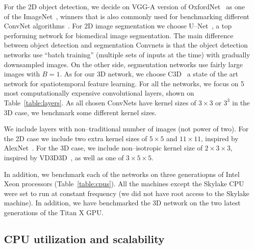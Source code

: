   For the 2D object detection, we decide on VGG-A version of
  OxfordNet~\cite{simonyan2014very} as one of the
  ImageNet~\cite{imagenet_cvpr09,ILSVRC15}, winners that is also
  commonly used for benchmarking different ConvNet
  algorithms~\cite{imagenetwinners}.  For 2D image segmentation we
  choose U--Net~\cite{ronneberger2015u}, a top performing network for
  biomedical image segmentation.  The main difference between object
  detection and segmentation Convnets is that the object detection
  networks use ``batch training'' (multiple sets of inputs at the
  time) with gradually downsampled images.  On the other side,
  segmentation networks use fairly large images with $B=1$.  As for
  our 3D network, we choose C3D~\cite{maturana_iros_2015} a state of
  the art network for spatiotemporal feature learning.  For all the
  networks, we focus on 5 most computationally expensive convolutional
  layers, shown on Table~\ref{table:layers}.  As all chosen ConvNets
  have kernel sizes of $3 \times 3$ or $3^3$ in the 3D case, we
  benchmark some different kernel sizes.

  We include layers with non--traditional number of images (not power
  of two).  For the 2D case we include two extra kernel sizes of $5
  \times 5$ and $11 \times 11$, inspired by
  AlexNet~\cite{krizhevsky2012imagenet}.  For the 3D case, we include
  non--isotropic kernel size of $2 \times 3 \times 3$, inspired by
  VD3D3D~\cite{lee2015recursive}, as well as one of $3 \times 5 \times
  5$.

  In addition, we benchmark each of the networks on three generatiopns
  of Intel Xeon processors (Table~\ref{table:cpus}).  All the machines
  except the Skylake CPU were set to run at constant frequency (we did
  not have root access to the Skylake machine).  In addition, we have
  benchmarked the 3D network on the two latest generations of the
  Titan X GPU.

  \subsection{CPU utilization and scalability}

